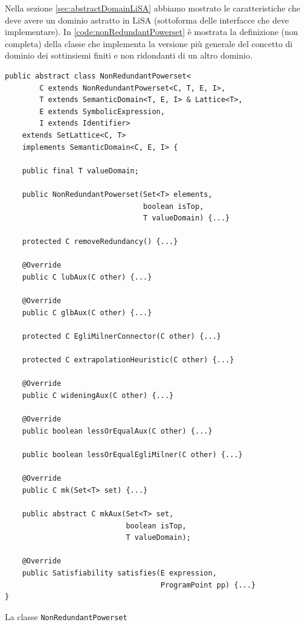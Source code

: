 Nella sezione \ref{sec:abstractDomainLiSA} abbiamo mostrato le caratteristiche che deve avere un dominio astratto in LiSA (sottoforma delle interfacce che deve implementare). In \ref{code:nonRedundantPowerset} è mostrata la definizione (non completa) della classe che implementa la versione più generale del concetto di dominio dei sottinsiemi finiti e non ridondanti di un altro dominio.
\begin{algorithm}
\lstset{frame=none}
\begin{lstlisting}[belowskip=-1.1 \baselineskip]
public abstract class NonRedundantPowerset<
        C extends NonRedundantPowerset<C, T, E, I>,
        T extends SemanticDomain<T, E, I> & Lattice<T>,
        E extends SymbolicExpression,
        I extends Identifier> 
    extends SetLattice<C, T> 
    implements SemanticDomain<C, E, I> {

    public final T valueDomain;
    
    public NonRedundantPowerset(Set<T> elements, 
                                boolean isTop, 
                                T valueDomain) {...}
    
    protected C removeRedundancy() {...}
    
    @Override
    public C lubAux(C other) {...}
    
    @Override
    public C glbAux(C other) {...}
    
    protected C EgliMilnerConnector(C other) {...}
    
    protected C extrapolationHeuristic(C other) {...}
    
    @Override
    public C wideningAux(C other) {...}
    
    @Override
    public boolean lessOrEqualAux(C other) {...}
    
    public boolean lessOrEqualEgliMilner(C other) {...}
    
    @Override
    public C mk(Set<T> set) {...}
    
    public abstract C mkAux(Set<T> set, 
                            boolean isTop, 
                            T valueDomain);
    
    @Override
    public Satisfiability satisfies(E expression, 
                                    ProgramPoint pp) {...}
}
\end{lstlisting}
\caption{La classe \texttt{NonRedundantPowerset}}
\label{code:nonRedundantPowerset}
\end{algorithm}
